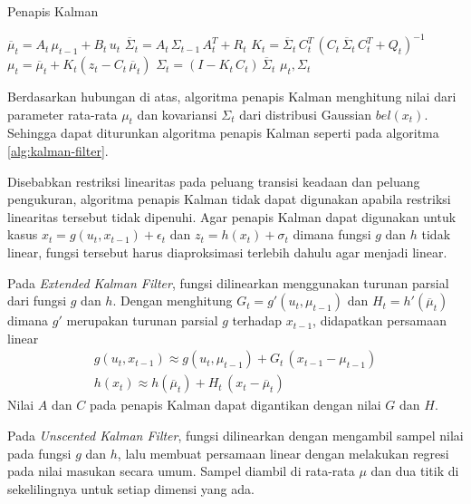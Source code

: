 \begin{algorithm}
    \caption{Penapis Kalman}
    \label{alg:kalman-filter}
    \begin{algorithmic}[1]
        \State $\overline{\mu}_t = A_t\, \mu_{t-1} + B_t\, u_t$
        \State $\overline{\Sigma}_t = A_t\, \Sigma_{t-1}\, A_t^T + R_t$
        \State $K_t = \overline{\Sigma}_t\, C_t^T\, (C_t\, \overline{\Sigma}_t\, C_t^T + Q_t)^{-1}$
        \State $\mu_t = \overline{\mu}_t + K_t(z_t - C_t\, \overline{\mu}_t)$
        \State $\Sigma_t = (I - K_t\, C_t)\, \overline{\Sigma}_t$
        \State \Return $\mu_t, \Sigma_t$
        \EndFunction
    \end{algorithmic}
\end{algorithm}

Berdasarkan hubungan di atas, algoritma penapis Kalman menghitung nilai dari parameter rata-rata $\mu_t$ dan kovariansi $\Sigma_t$ dari distribusi Gaussian $bel(x_t)$. Sehingga dapat diturunkan algoritma penapis Kalman seperti pada algoritma \ref{alg:kalman-filter}.

Disebabkan restriksi linearitas pada peluang transisi keadaan dan peluang pengukuran, algoritma penapis Kalman tidak dapat digunakan apabila restriksi linearitas tersebut tidak dipenuhi. Agar penapis Kalman dapat digunakan untuk kasus $x_t = g(u_t, x_{t-1}) + \epsilon_t$ dan $z_t = h(x_t) + \sigma_t$ dimana fungsi $g$ dan $h$ tidak linear, fungsi tersebut harus diaproksimasi terlebih dahulu agar menjadi linear.

Pada \textit{Extended Kalman Filter}, fungsi dilinearkan menggunakan turunan parsial dari fungsi $g$ dan $h$. Dengan menghitung $G_t = g'(u_t, \mu_{t-1})$ dan $H_t = h'(\overline{\mu}_t)$ dimana $g'$ merupakan turunan parsial $g$ terhadap $x_{t-1}$, didapatkan persamaan linear
\begin{align}
    g(u_t, x_{t-1}) \approx g(u_t, \mu_{t-1}) + G_t\, (x_{t-1} - \mu_{t-1}) \\
    h(x_t) \approx h(\overline{\mu}_t) + H_t\, (x_t - \overline{\mu}_t)
\end{align}
Nilai $A$ dan $C$ pada penapis Kalman dapat digantikan dengan nilai $G$ dan $H$.

Pada \textit{Unscented Kalman Filter}, fungsi dilinearkan dengan mengambil sampel nilai pada fungsi $g$ dan $h$, lalu membuat persamaan linear dengan melakukan regresi pada nilai masukan secara umum. Sampel diambil di rata-rata $\mu$ dan dua titik di sekelilingnya untuk setiap dimensi yang ada.

